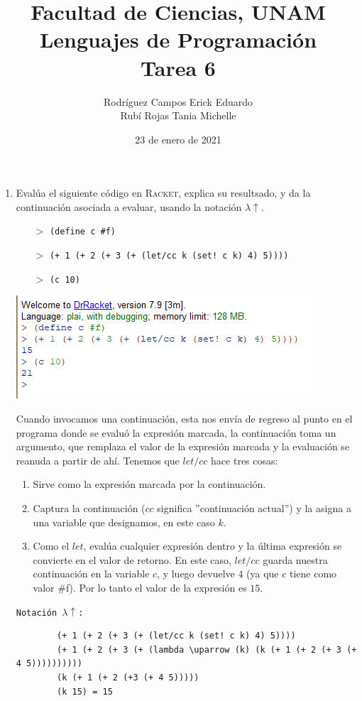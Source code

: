 \documentclass[letterpaper,11pt]{article}
\title{Facultad de Ciencias, UNAM \\ 
       Lenguajes de Programación\\ 
       Tarea 6}
\author{ Rodríguez Campos Erick Eduardo\\ Rubí Rojas Tania Michelle}
\date{23 de enero de 2021}
\begin{document}
\maketitle 

\begin{enumerate}
    \item Evalúa el siguiente código en \textsc{Racket}, explica su resultsado, y 
    da la continuación asociada a evaluar, usando la notación $\lambda \uparrow$.
    \begin{itemize}
        \item [$>$] \texttt{(define c \#f)}
        \item [$>$] \texttt{(+ 1 (+ 2 (+ 3 (+ (let/cc k (set! c k) 4) 5))))}
        \item [$>$] \texttt{(c 10)}
    \end{itemize}
    \begin{center}
        \includegraphics[scale=.9]{imagenes/rack01.PNG}
    \end{center}
    Cuando invocamos una continuación, esta nos envía de regreso al punto en el programa donde se evaluó la expresión marcada, la continuación toma un argumento, que remplaza el valor de la expresión marcada y la evaluación se reanuda a partir de ahí. 
    Tenemos que \textit{$let/cc$} hace tres cosas:
    \begin{enumerate}
        \item Sirve como la expresión marcada por la continuación.
        \item Captura la continuación ($cc$ significa ''continuación actual'') y la asigna a una variable que designamos, en este caso $k$.
        \item Como el $let$, evalúa cualquier expresión dentro y la última expresión se convierte en el valor de retorno. En este caso, $let/cc$ guarda nuestra continuación en la variable $c$, y luego devuelve $4$ (ya que $c$ tiene como valor \#f). Por lo tanto el valor de la expresión es $15$.
    \end{enumerate}
    \texttt{Notación $\lambda \uparrow$:}
    \begin{verbatim}
        (+ 1 (+ 2 (+ 3 (+ (let/cc k (set! c k) 4) 5))))
        (+ 1 (+ 2 (+ 3 (+ (lambda \uparrow (k) (k (+ 1 (+ 2 (+ 3 (+ 4 5))))))))))
        (k (+ 1 (+ 2 (+3 (+ 4 5)))))
        (k 15) = 15
    \end{verbatim}


\end{enumerate}
\end{document}
